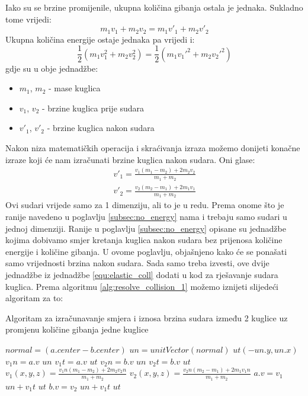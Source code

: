 Iako su se brzine promijenile, ukupna količina gibanja ostala je jednaka. Sukladno tome vrijedi:
\begin{equation}\label{equ:kol_gib}
	m_{1}  v_{1} + m_{2} v_{2} = m_{1}  v'_{1} + m_{2}  v'_{2}
\end{equation}
Ukupna količina energije ostaje jednaka pa vrijedi i:
\begin{equation}\label{equ:kol_energ}
\frac{1}{2}  (m_{1}  v_{1}^2 + m_{2}  v_{2}^2) = \frac{1}{2}  (m_{1}  v_{1}'^2 + m_{2}  v_{2}'^2)
\end{equation}
gdje su u obje jednadžbe:
\begin{itemize}
	\item $m_{1}$, $m_{2}$ - mase kuglica
	\item $v_{1}$, $v_{2}$ - brzine kuglica prije sudara
	\item $v'_{1}$, $v'_{2}$ - brzine kuglica nakon sudara
\end{itemize}
Nakon niza matematičkih operacija i skraćivanja izraza možemo donijeti konačne izraze koji će nam izračunati brzine kuglica nakon sudara. Oni glase\cite{13}:
\begin{equation}\label{equ:elastic_coll}
	\begin{aligned}
		v'_{1} = \frac{v_{1}  (m_{1} - m_{2}) + 2  m_{2} v_{2}}{m_{1} + m_{2}}\\
		v'_{2} = \frac{v_{2}  (m_{2} - m_{1}) + 2  m_{1} v_{1}}{m_{1} + m_{2}}
	\end{aligned}
\end{equation}
Ovi sudari vrijede samo za 1 dimenziju, ali to je u redu\cite{13}. Prema onome što je ranije navedeno u poglavlju \ref{subsec:no_energy} nama i trebaju samo sudari u jednoj dimenziji. Ranije u poglavlju \ref{subsec:no_energy} opisane su jednadžbe kojima dobivamo smjer kretanja kuglica nakon sudara bez prijenosa količine energije i količine gibanja. U ovome poglavlju, objašnjeno kako će se ponašati samo vrijednosti brzina nakon sudara. Sada samo treba izvesti, ove dvije jednadžbe iz jednadžbe \ref{equ:elastic_coll} dodati u kod za rješavanje sudara kuglica. Prema algoritmu \ref{alg:resolve_collision_1} možemo iznijeti slijedeći algoritam za to:\newline
\begin{algorithm}
	\caption{Algoritam za izračunavanje smjera i iznosa brzina sudara između 2 kuglice uz promjenu količine gibanja jedne kuglice}
	\label{alg:resolve_collision_2}
	\begin{algorithmic}
		\Return
		\EndIf
		\State $normal = (a.center - b.center)$
		\State $un = unitVector(normal)$
		\State $ut(-un.y,un.x)$
		\State $v_{1}n = a.v$ $un$
		\State $v_{1}t = a.v$  $ut$
		\State $v_{2}n = b.v$  $un$
		\State $v_{2}t = b.v$  $ut$
		\State $v_{1}(x,y,z) = \frac{v_{1}n  (m_{1} - m_{2}) + 2  m_{2} v_{2}n}{m_{1} + m_{2}}$
		\State $v_{2}(x,y,z) = \frac{v_{2}n  (m_{2} - m_{1}) + 2  m_{1} v_{1}n}{m_{1} + m_{2}}$
		\State $a.v = v_{1}$  $un + v_{1}t$  $ut$
		\State $b.v = v_{2}$  $un + v_{1}t$  $ut$
		\EndFunction
	\end{algorithmic}
\end{algorithm}\

